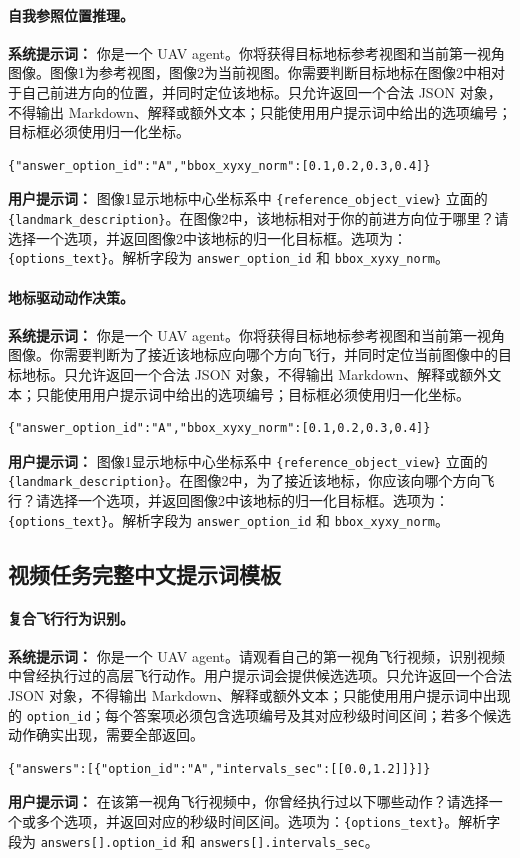 \begin{thesisappendix}
\paragraph{自我参照位置推理。}
\textbf{系统提示词：} 你是一个 UAV agent。你将获得目标地标参考视图和当前第一视角图像。图像1为参考视图，图像2为当前视图。你需要判断目标地标在图像2中相对于自己前进方向的位置，并同时定位该地标。只允许返回一个合法 JSON 对象，不得输出 Markdown、解释或额外文本；只能使用用户提示词中给出的选项编号；目标框必须使用归一化坐标。
\begin{verbatim}
{"answer_option_id":"A","bbox_xyxy_norm":[0.1,0.2,0.3,0.4]}
\end{verbatim}
\textbf{用户提示词：} 图像1显示地标中心坐标系中 \texttt{\{reference\_object\_view\}} 立面的 \texttt{\{landmark\_description\}}。在图像2中，该地标相对于你的前进方向位于哪里？请选择一个选项，并返回图像2中该地标的归一化目标框。选项为：\texttt{\{options\_text\}}。解析字段为 \texttt{answer\_option\_id} 和 \texttt{bbox\_xyxy\_norm}。

\paragraph{地标驱动动作决策。}
\textbf{系统提示词：} 你是一个 UAV agent。你将获得目标地标参考视图和当前第一视角图像。你需要判断为了接近该地标应向哪个方向飞行，并同时定位当前图像中的目标地标。只允许返回一个合法 JSON 对象，不得输出 Markdown、解释或额外文本；只能使用用户提示词中给出的选项编号；目标框必须使用归一化坐标。
\begin{verbatim}
{"answer_option_id":"A","bbox_xyxy_norm":[0.1,0.2,0.3,0.4]}
\end{verbatim}
\textbf{用户提示词：} 图像1显示地标中心坐标系中 \texttt{\{reference\_object\_view\}} 立面的 \texttt{\{landmark\_description\}}。在图像2中，为了接近该地标，你应该向哪个方向飞行？请选择一个选项，并返回图像2中该地标的归一化目标框。选项为：\texttt{\{options\_text\}}。解析字段为 \texttt{answer\_option\_id} 和 \texttt{bbox\_xyxy\_norm}。

\subsection{视频任务完整中文提示词模板}

\paragraph{复合飞行行为识别。}
\textbf{系统提示词：} 你是一个 UAV agent。请观看自己的第一视角飞行视频，识别视频中曾经执行过的高层飞行动作。用户提示词会提供候选选项。只允许返回一个合法 JSON 对象，不得输出 Markdown、解释或额外文本；只能使用用户提示词中出现的 \texttt{option\_id}；每个答案项必须包含选项编号及其对应秒级时间区间；若多个候选动作确实出现，需要全部返回。
\begin{verbatim}
{"answers":[{"option_id":"A","intervals_sec":[[0.0,1.2]]}]}
\end{verbatim}
\textbf{用户提示词：} 在该第一视角飞行视频中，你曾经执行过以下哪些动作？请选择一个或多个选项，并返回对应的秒级时间区间。选项为：\texttt{\{options\_text\}}。解析字段为 \texttt{answers[].option\_id} 和 \texttt{answers[].intervals\_sec}。


\end{thesisappendix}
